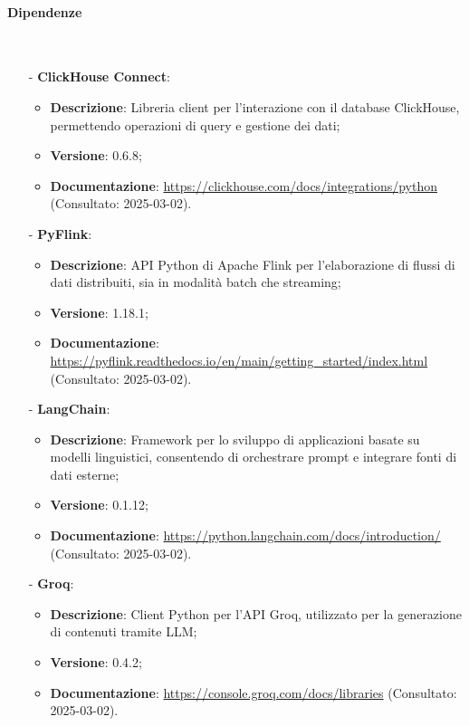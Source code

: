 \documentclass[10pt]{article}
\newcommand{\myparagraph}[1]{\paragraph{#1}\mbox{}\\}
\begin{document}
\myparagraph{Dipendenze}
\begin{itemize}
    \item[-] \textbf{ClickHouse Connect}:
    \begin{itemize}
        \item \textbf{Descrizione}: Libreria client per l'interazione con il database ClickHouse, permettendo operazioni di query e gestione dei dati;
        \item \textbf{Versione}: 0.6.8;
        \item \textbf{Documentazione}: \textcolor{blue}{\url{https://clickhouse.com/docs/integrations/python}} (Consultato: 2025-03-02).
    \end{itemize}
    
    \item[-] \textbf{PyFlink}:
    \begin{itemize}
        \item \textbf{Descrizione}: API Python di Apache Flink per l'elaborazione di flussi di dati distribuiti, sia in modalità batch che streaming;
        \item \textbf{Versione}: 1.18.1;
        \item \textbf{Documentazione}: \textcolor{blue}{\url{https://pyflink.readthedocs.io/en/main/getting_started/index.html}} (Consultato: 2025-03-02).
    \end{itemize}
    
    \item[-] \textbf{LangChain}:
    \begin{itemize}
        \item \textbf{Descrizione}: Framework per lo sviluppo di applicazioni basate su modelli linguistici, consentendo di orchestrare prompt e integrare fonti di dati esterne;
        \item \textbf{Versione}: 0.1.12;
        \item \textbf{Documentazione}: \textcolor{blue}{\url{https://python.langchain.com/docs/introduction/}} (Consultato: 2025-03-02).
    \end{itemize}
    
    \item[-] \textbf{Groq}:
    \begin{itemize}
        \item \textbf{Descrizione}: Client Python per l'API Groq, utilizzato per la generazione di contenuti tramite LLM;
        \item \textbf{Versione}: 0.4.2;
        \item \textbf{Documentazione}: \textcolor{blue}{\url{https://console.groq.com/docs/libraries}} (Consultato: 2025-03-02).
    \end{itemize}
    

\end{itemize}
\end{document}
